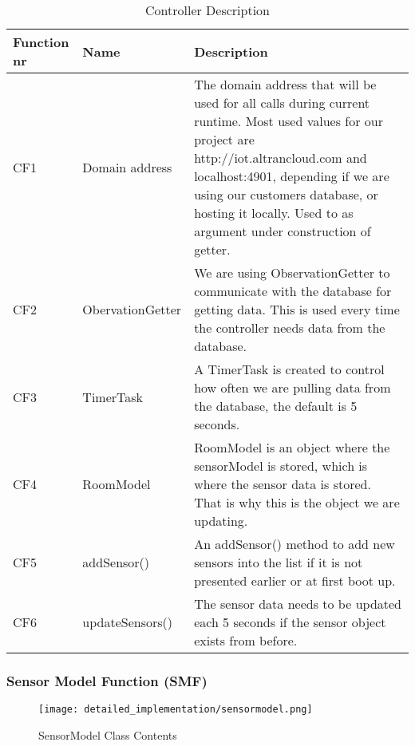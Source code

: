 \documentclass[../document]{subfiles}
\begin{document}
\begin{table}[H]
\caption{Controller Description}
\centering
\begin{tabularx}{\textwidth}{|l|l|X|}
	\hline
	Function nr
	&Name
	&Description
	\\ \hline CF1
	&Domain address
	&The domain address that will be used for all calls during current runtime. Most used values for our project are http://iot.altrancloud.com and localhost:4901, depending if we are using our customers database, or hosting it locally. Used to as argument under construction of getter.
	\\ \hline CF2
	&ObervationGetter
	&We are using ObservationGetter to communicate with the database for getting data. This is used every time the controller needs data from the database.
	\\ \hline CF3
	&TimerTask
	&A TimerTask is created to control how often we are pulling data from the database, the default is 5 seconds.
	\\ \hline CF4
	&RoomModel
	&RoomModel is an object where the sensorModel is stored, which is where the sensor data is stored. That is why this is the object we are updating. 
	\\ \hline CF5
	&addSensor()
	&An addSensor() method to add new sensors into the list if it is not presented earlier or at first boot up.
	\\ \hline CF6
	&updateSensors()
	&The sensor data needs to be updated each 5 seconds if the sensor object exists from before.
	\\ \hline 
\end{tabularx}
\end{table}

\subsubsection{Sensor Model Function (SMF)}

\begin{figure}[H]
\centering
\texttt{[image: detailed\_implementation/sensormodel.png]}
\caption{SensorModel Class Contents}
\end{figure}
\end{document}
